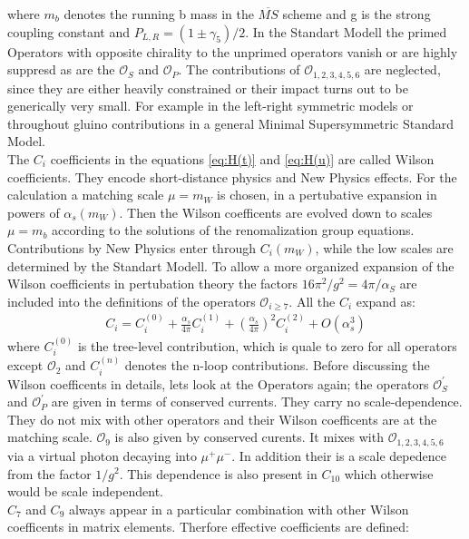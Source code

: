 \documentclass[english]{uzhpub}
\begin{document}
 where $m_b$ denotes the running b mass in the $\overline{MS}$ scheme and g is the strong coupling constant and $P_{L,R} = ( 1 \pm \gamma_5)/2$. In the Standart Modell the primed Operators with opposite chirality to the unprimed operators vanish or are highly suppresd as are the $\mathcal{O}_S$ and $\mathcal{O}_P$. The contributions of $\mathcal{O}_{1,2,3,4,5,6}$ are neglected, since they are either heavily constrained or their impact turns out to be generically very small. For example in the left-right symmetric models or throughout gluino contributions in a general Minimal Supersymmetric Standard Model. \\
 The $C_i$ coefficients in the equations \ref{eq:H(t)} and \ref{eq:H(u)} are called Wilson coefficients. They encode short-distance physics and New Physics effects. For the calculation a matching scale $\mu = m_W$ is chosen, in a pertubative expansion in powers of $\alpha_s (m_W)$. Then the Wilson coefficents are evolved down to scales $\mu = m_b$ according to the solutions of the renomalization group equations. Contributions by New Physics enter through $C_i(m_W)$, while the low scales are determined by the Standart Modell. To allow a more organized expansion of the Wilson coefficients in pertubation theory the factors $16 \pi^2 / g^2 = 4 \pi / \alpha_S$ are included into the definitions of the operators $\mathcal{O}_{i \geq 7}$. All the $C_i$ expand as:
 \begin{align}
  C_i = C_i^{(0)} + \frac{\alpha_s}{4 \pi} C_i^{(1)} + \left( \frac{\alpha_s}{4 \pi} \right)^2 C_i^{(2)} + O(\alpha_s^3)
 \end{align}
 where $C_i^{(0)}$ is the tree-level contribution, which is quale to zero for all operators except $\mathcal{O}_2$ and $C_i^{(n)}$ denotes the n-loop contributions.
 Before discussing the Wilson coefficents in details, lets look at the Operators again; the operators $\mathcal{O}_S^\prime$ and $\mathcal{O}_P^\prime$ are given in terms of conserved currents. They carry no scale-dependence. They do not mix with other operators and their Wilson coefficents are at the matching scale. $\mathcal{O}_9$ is also given by conserved curents. It mixes with $\mathcal{O}_{1,2,3,4,5,6}$ via a virtual photon decaying into $\mu^+ \mu^-$. In addition their is a scale depedence from the factor $1/g^2$. This dependence is also present in $C_{10}$ which otherwise would be scale independent. \\
 $C_7$ and $C_9$ always appear in a particular combination with other Wilson coefficents in matrix elements. Therfore effective coefficients are defined:
\end{document}
